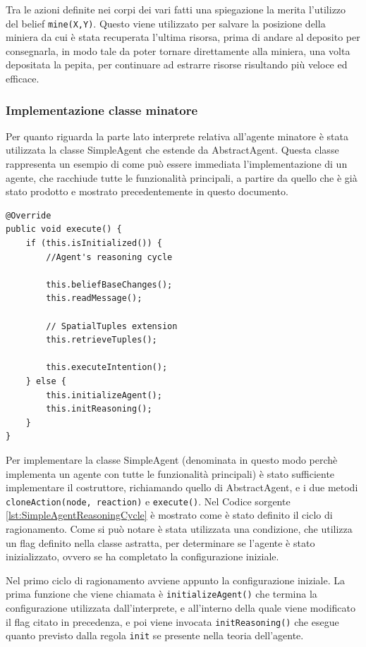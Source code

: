 Tra le azioni definite nei corpi dei vari fatti una spiegazione la merita l'utilizzo del belief \texttt{mine(X,Y)}. Questo viene utilizzato per salvare la posizione della miniera da cui è stata recuperata l'ultima risorsa, prima di andare al deposito per consegnarla, in modo tale da poter tornare direttamente alla miniera, una volta depositata la pepita, per continuare ad estrarre risorse risultando più veloce ed efficace.

\subsubsection{Implementazione classe minatore}
Per quanto riguarda la parte lato interprete relativa all'agente minatore è stata utilizzata la classe SimpleAgent che estende da AbstractAgent. Questa classe rappresenta un esempio di come può essere immediata l'implementazione di un agente, che racchiude tutte le funzionalità principali, a partire da quello che è già stato prodotto e mostrato precedentemente in questo documento.

\switchToJava{}{}
\begin{lstlisting}[float,firstnumber=1,label={lst:SimpleAgentReasoningCycle},caption={Ciclo di ragionamento per l'agente completo}]
@Override
public void execute() {
    if (this.isInitialized()) {
        //Agent's reasoning cycle

        this.beliefBaseChanges();
        this.readMessage();

        // SpatialTuples extension
        this.retrieveTuples();

        this.executeIntention();
    } else {
        this.initializeAgent();
        this.initReasoning();
    }
}
\end{lstlisting}

Per implementare la classe SimpleAgent (denominata in questo modo perchè implementa un agente con tutte le funzionalità principali) è stato sufficiente implementare il costruttore, richiamando quello di AbstractAgent, e i due metodi \texttt{cloneAction(node, reaction)} e \texttt{execute()}.
Nel Codice sorgente \ref{lst:SimpleAgentReasoningCycle} è mostrato come è stato definito il ciclo di ragionamento.
Come si può notare è stata utilizzata una condizione, che utilizza un flag definito nella classe astratta, per determinare se l'agente è stato inizializzato, ovvero se ha completato la configurazione iniziale.

Nel primo ciclo di ragionamento avviene appunto la configurazione iniziale. La prima funzione che viene chiamata è \texttt{initializeAgent()} che termina la configurazione utilizzata dall'interprete, e all'interno della quale viene modificato il flag citato in precedenza, e poi viene invocata \texttt{initReasoning()} che esegue quanto previsto dalla regola \texttt{init} se presente nella teoria dell'agente.

